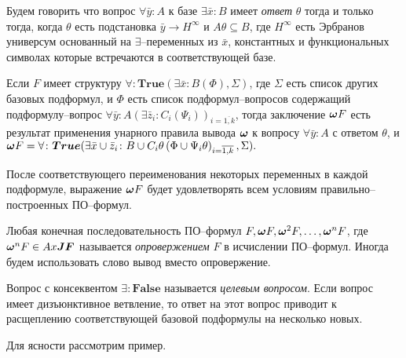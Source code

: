 \begin{definition}
\label{ircond}
Будем говорить что вопрос $\forall \bar{y}\colon A$ к базе $\exists \bar{x}\colon B$ имеет {\em ответ} $\theta$  тогда и только тогда, когда $\theta$ есть подстановка $\bar{y} \rightarrow H^{\infty}$ и $A\theta \subseteq B$, где $H^{\infty}$ есть Эрбранов универсум основанный на $\exists$--переменных из $\bar{x}$, константных и функциональных символах которые встречаются в соответствующей базе.
\end{definition}


\begin{definition}
\label{omega}
Если $F$ имеет структуру $\forall\colon\boldsymbol{True}\left(\exists \bar{x}\colon B\left(\Phi\right),\Sigma\right)$, где $\Sigma$ есть список других базовых подформул, и $\Phi$ есть список подформул--вопросов содержащий подформулу--вопрос $\forall \bar{y}\colon A(\exists \bar{z}_i\colon C_i\left(\Psi_i\right))_{i=\overline{1,k}}$, тогда заключение $\boldsymbol{\omega} F$ есть результат применения унарного правила вывода $\boldsymbol{\omega}$ к вопросу $\forall \bar{y}\colon A$ с ответом $\theta$, и $\boldsymbol{\omega} F = \forall\colon\boldsymbol{True}(\exists \bar{x} \cup \bar{z}_i\colon B \cup C_i\theta\left(\Phi \cup \Psi_i\theta\right)_{i=\overline{1,k}},\Sigma).$

\end{definition}

После соответствующего переименования некоторых переменных в каждой подформуле, выражение $\boldsymbol{\omega} F$ будет удовлетворять всем условиям правильно--построенных ПО--формул.

%
Любая конечная последовательность ПО--формул $F, \boldsymbol{\omega} F, \boldsymbol{\omega}^2 F,\ldots,\boldsymbol{\omega}^n F$, где $\boldsymbol{\omega}^n F \in Ax\boldsymbol{JF}$ называется {\em опровержением} $F$ в исчислении ПО--формул. Иногда будем использовать слово вывод вместо опровержение.

Вопрос с консеквентом $\exists:\boldsymbol{False}$ называется {\em целевым вопросом}. Если вопрос имеет дизъюнктивное ветвление, то ответ на этот вопрос приводит к расщеплению соответствующей базовой подформулы на несколько новых.

Для ясности рассмотрим пример.

